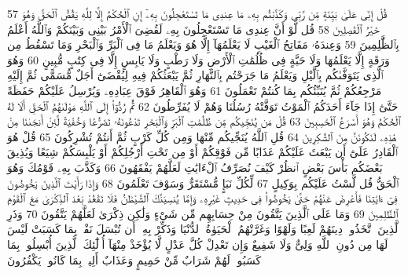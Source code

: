 {\tiny\colorbox{cl_aya}{57}} قُلْ إِنِّى عَلَىٰ بَيِّنَةٍ مِّن رَّبِّى وَكَذَّبْتُم بِهِۦ مَا عِندِى مَا تَسْتَعْجِلُونَ بِهِۦٓ إِنِ ٱلْحُكْمُ إِلَّا لِلَّهِ يَقُصُّ ٱلْحَقَّ وَهُوَ خَيْرُ ٱلْفَٰصِلِينَ
{\tiny\colorbox{cl_aya}{58}} قُل لَّوْ أَنَّ عِندِى مَا تَسْتَعْجِلُونَ بِهِۦ لَقُضِىَ ٱلْأَمْرُ بَيْنِى وَبَيْنَكُمْ وَٱللَّهُ أَعْلَمُ بِٱلظَّٰلِمِينَ
{\tiny\colorbox{cl_aya}{59}} وَعِندَهُۥ مَفَاتِحُ ٱلْغَيْبِ لَا يَعْلَمُهَآ إِلَّا هُوَ وَيَعْلَمُ مَا فِى ٱلْبَرِّ وَٱلْبَحْرِ وَمَا تَسْقُطُ مِن وَرَقَةٍ إِلَّا يَعْلَمُهَا وَلَا حَبَّةٍ فِى ظُلُمَٰتِ ٱلْأَرْضِ وَلَا رَطْبٍ وَلَا يَابِسٍ إِلَّا فِى كِتَٰبٍ مُّبِينٍ
{\tiny\colorbox{cl_aya}{60}} وَهُوَ ٱلَّذِى يَتَوَفَّىٰكُم بِٱلَّيْلِ وَيَعْلَمُ مَا جَرَحْتُم بِٱلنَّهَارِ ثُمَّ يَبْعَثُكُمْ فِيهِ لِيُقْضَىٰٓ أَجَلٌ مُّسَمًّى ثُمَّ إِلَيْهِ مَرْجِعُكُمْ ثُمَّ يُنَبِّئُكُم بِمَا كُنتُمْ تَعْمَلُونَ
{\tiny\colorbox{cl_aya}{61}} وَهُوَ ٱلْقَاهِرُ فَوْقَ عِبَادِهِۦ وَيُرْسِلُ عَلَيْكُمْ حَفَظَةً حَتَّىٰٓ إِذَا جَآءَ أَحَدَكُمُ ٱلْمَوْتُ تَوَفَّتْهُ رُسُلُنَا وَهُمْ لَا يُفَرِّطُونَ
{\tiny\colorbox{cl_aya}{62}} ثُمَّ رُدُّوٓا۟ إِلَى ٱللَّهِ مَوْلَىٰهُمُ ٱلْحَقِّ أَلَا لَهُ ٱلْحُكْمُ وَهُوَ أَسْرَعُ ٱلْحَٰسِبِينَ
{\tiny\colorbox{cl_aya}{63}} قُلْ مَن يُنَجِّيكُم مِّن ظُلُمَٰتِ ٱلْبَرِّ وَٱلْبَحْرِ تَدْعُونَهُۥ تَضَرُّعًا وَخُفْيَةً لَّئِنْ أَنجَىٰنَا مِنْ هَٰذِهِۦ لَنَكُونَنَّ مِنَ ٱلشَّٰكِرِينَ
{\tiny\colorbox{cl_aya}{64}} قُلِ ٱللَّهُ يُنَجِّيكُم مِّنْهَا وَمِن كُلِّ كَرْبٍ ثُمَّ أَنتُمْ تُشْرِكُونَ
{\tiny\colorbox{cl_aya}{65}} قُلْ هُوَ ٱلْقَادِرُ عَلَىٰٓ أَن يَبْعَثَ عَلَيْكُمْ عَذَابًا مِّن فَوْقِكُمْ أَوْ مِن تَحْتِ أَرْجُلِكُمْ أَوْ يَلْبِسَكُمْ شِيَعًا وَيُذِيقَ بَعْضَكُم بَأْسَ بَعْضٍ ٱنظُرْ كَيْفَ نُصَرِّفُ ٱلْءَايَٰتِ لَعَلَّهُمْ يَفْقَهُونَ
{\tiny\colorbox{cl_aya}{66}} وَكَذَّبَ بِهِۦ قَوْمُكَ وَهُوَ ٱلْحَقُّ قُل لَّسْتُ عَلَيْكُم بِوَكِيلٍ
{\tiny\colorbox{cl_aya}{67}} لِّكُلِّ نَبَإٍ مُّسْتَقَرٌّ وَسَوْفَ تَعْلَمُونَ
{\tiny\colorbox{cl_aya}{68}} وَإِذَا رَأَيْتَ ٱلَّذِينَ يَخُوضُونَ فِىٓ ءَايَٰتِنَا فَأَعْرِضْ عَنْهُمْ حَتَّىٰ يَخُوضُوا۟ فِى حَدِيثٍ غَيْرِهِۦ وَإِمَّا يُنسِيَنَّكَ ٱلشَّيْطَٰنُ فَلَا تَقْعُدْ بَعْدَ ٱلذِّكْرَىٰ مَعَ ٱلْقَوْمِ ٱلظَّٰلِمِينَ
{\tiny\colorbox{cl_aya}{69}} وَمَا عَلَى ٱلَّذِينَ يَتَّقُونَ مِنْ حِسَابِهِم مِّن شَىْءٍ وَلَٰكِن ذِكْرَىٰ لَعَلَّهُمْ يَتَّقُونَ
{\tiny\colorbox{cl_aya}{70}} وَذَرِ ٱلَّذِينَ ٱتَّخَذُوا۟ دِينَهُمْ لَعِبًا وَلَهْوًا وَغَرَّتْهُمُ ٱلْحَيَوٰةُ ٱلدُّنْيَا وَذَكِّرْ بِهِۦٓ أَن تُبْسَلَ نَفْسٌۢ بِمَا كَسَبَتْ لَيْسَ لَهَا مِن دُونِ ٱللَّهِ وَلِىٌّ وَلَا شَفِيعٌ وَإِن تَعْدِلْ كُلَّ عَدْلٍ لَّا يُؤْخَذْ مِنْهَآ أُو۟لَٰٓئِكَ ٱلَّذِينَ أُبْسِلُوا۟ بِمَا كَسَبُوا۟ لَهُمْ شَرَابٌ مِّنْ حَمِيمٍ وَعَذَابٌ أَلِيمٌۢ بِمَا كَانُوا۟ يَكْفُرُونَ
